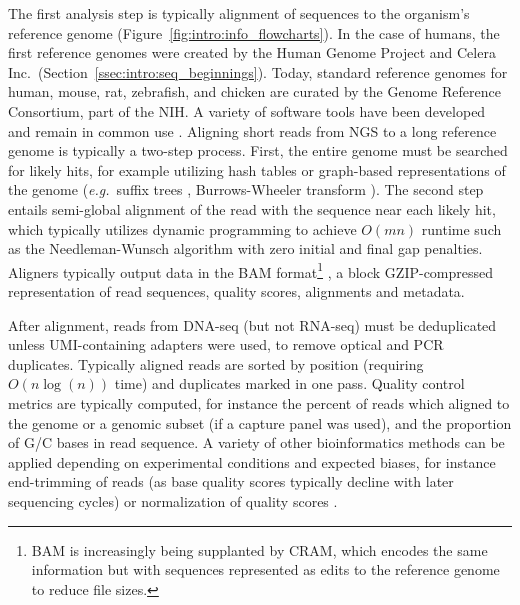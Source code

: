 The first analysis step is typically alignment of sequences to the organism's reference genome (Figure~\ref{fig:intro:info_flowcharts}). In the case of humans, the first reference genomes were created by the Human Genome Project and Celera Inc.\ (Section~\ref{ssec:intro:seq_beginnings}). Today, standard reference genomes for human, mouse, rat, zebrafish, and chicken are curated by the Genome Reference Consortium, part of the NIH\@. A variety of software tools have been developed and remain in common use \cite{li2010}. Aligning short reads from NGS to a long reference genome is typically a two-step process. First, the entire genome must be searched for likely hits, for example utilizing hash tables \cite{altschul1990} or graph-based representations of the genome (\textit{e.g.}\ suffix trees \cite{abouelhoda2004}, Burrows-Wheeler transform \cite{burrows1994}). The second step entails semi-global alignment of the read with the sequence near each likely hit, which typically utilizes dynamic programming to achieve $O(mn)$ runtime such as the Needleman-Wunsch algorithm \cite{needleman1970} with zero initial and final gap penalties. Aligners typically output data in the BAM format\footnote{BAM is increasingly being supplanted by CRAM, which encodes the same information but with sequences represented as edits to the reference genome to reduce file sizes.} \cite{samtools}, a block GZIP-compressed representation of read sequences, quality scores, alignments and metadata.

After alignment, reads from DNA-seq (but not RNA-seq) must be deduplicated unless UMI-containing adapters were used, to remove optical and PCR duplicates. Typically aligned reads are sorted by position (requiring $O(n\log(n))$ time) and duplicates marked in one pass. Quality control metrics are typically computed, for instance the percent of reads which aligned to the genome or a genomic subset (if a capture panel was used), and the proportion of G/C bases in read sequence. A variety of other bioinformatics methods can be applied depending on experimental conditions and expected biases, for instance end-trimming of reads (as base quality scores typically decline with later sequencing cycles) \cite{martin2011} or normalization of quality scores \cite{mckenna10}.

